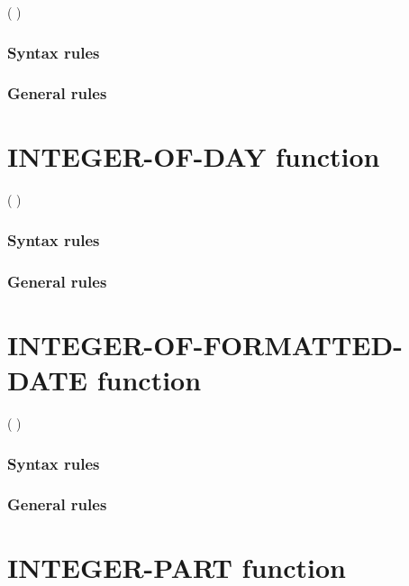 \begin{syntax}
    ( \argument )
\end{syntax}

\subsubsection{Syntax rules}

\subsubsection{General rules}

\section{INTEGER-OF-DAY function}

\begin{syntax}
    ( \argument )
\end{syntax}

\subsubsection{Syntax rules}

\subsubsection{General rules}

\section{INTEGER-OF-FORMATTED-DATE function}

\begin{syntax}
    ( \argument \argument )
\end{syntax}

\subsubsection{Syntax rules}

\subsubsection{General rules}

\section{INTEGER-PART function}


